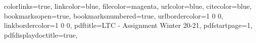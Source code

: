 \usepackage[latin1]{inputenc}
\usepackage{geometry}
\geometry{a4paper,left=30mm,right=30mm, top=25mm, bottom=25mm} 
\usepackage{setspace}
\usepackage{datetime}
\usepackage[numbers]{natbib}
\usepackage{amsmath}
\usepackage{sistyle}
\usepackage{amsfonts}
\usepackage{amssymb}
\usepackage{graphicx}
\usepackage{lineno}
\usepackage{textcomp}
\usepackage{booktabs}
\usepackage{fontawesome} %
\usepackage{markdown}
\usepackage{marvosym} %

\usepackage{tikz}
\usetikzlibrary{patterns}

\usepackage[german]{babel}
\usepackage{datetime}




\usepackage{natbib} %




\usepackage{hyperref}
\hypersetup
{
	colorlinks=true,
	linkcolor=blue,
	filecolor=magenta,      
	urlcolor=blue,
	citecolor=blue,
	bookmarksopen=true,
	bookmarksnumbered=true,
	urlbordercolor={1 0 0},
	linkbordercolor={1 0 0},
	pdftitle={LTC - Assignment Winter 20-21},
	pdfstartpage=1,
	pdfdisplaydoctitle=true,
}